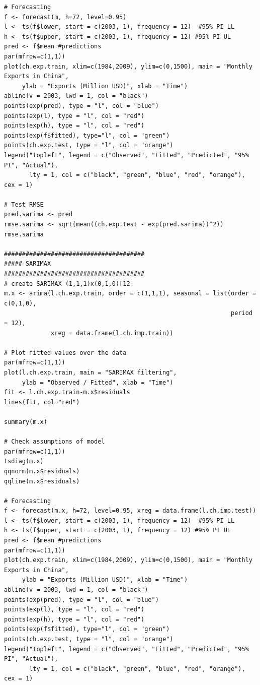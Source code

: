 \documentclass[]{article}
\begin{document}
\begin{Verbatim}[frame=single]
# Forecasting
f <- forecast(m, h=72, level=0.95)
l <- ts(f$lower, start = c(2003, 1), frequency = 12)  #95% PI LL
h <- ts(f$upper, start = c(2003, 1), frequency = 12) #95% PI UL
pred <- f$mean #predictions
par(mfrow=c(1,1))
plot(ch.exp.train, xlim=c(1984,2009), ylim=c(0,1500), main = "Monthly Exports in China",
     ylab = "Exports (Million USD)", xlab = "Time")
abline(v = 2003, lwd = 1, col = "black")
points(exp(pred), type = "l", col = "blue")
points(exp(l), type = "l", col = "red")
points(exp(h), type = "l", col = "red")
points(exp(f$fitted), type="l", col = "green")
points(ch.exp.test, type = "l", col = "orange")
legend("topleft", legend = c("Observed", "Fitted", "Predicted", "95% PI", "Actual"),
       lty = 1, col = c("black", "green", "blue", "red", "orange"), cex = 1)

# Test RMSE
pred.sarima <- pred
rmse.sarima <- sqrt(mean((ch.exp.test - exp(pred.sarima))^2))
rmse.sarima

#######################################
##### SARIMAX
#######################################
# create SARIMAX (1,1,1)x(0,1,0)[12]
m.x <- arima(l.ch.exp.train, order = c(1,1,1), seasonal = list(order = c(0,1,0),
                                                               period = 12),
             xreg = data.frame(l.ch.imp.train))

# Plot fitted values over the data
par(mfrow=c(1,1))
plot(l.ch.exp.train, main = "SARIMAX filtering", 
     ylab = "Observed / Fitted", xlab = "Time")
fit <- l.ch.exp.train-m.x$residuals
lines(fit, col="red")

summary(m.x)

# Check assumptions of model
par(mfrow=c(1,1))
tsdiag(m.x)
qqnorm(m.x$residuals)
qqline(m.x$residuals)

# Forecasting
f <- forecast(m.x, h=72, level=0.95, xreg = data.frame(l.ch.imp.test))
l <- ts(f$lower, start = c(2003, 1), frequency = 12)  #95% PI LL
h <- ts(f$upper, start = c(2003, 1), frequency = 12) #95% PI UL
pred <- f$mean #predictions
par(mfrow=c(1,1))
plot(ch.exp.train, xlim=c(1984,2009), ylim=c(0,1500), main = "Monthly Exports in China",
     ylab = "Exports (Million USD)", xlab = "Time")
abline(v = 2003, lwd = 1, col = "black")
points(exp(pred), type = "l", col = "blue")
points(exp(l), type = "l", col = "red")
points(exp(h), type = "l", col = "red")
points(exp(f$fitted), type="l", col = "green")
points(ch.exp.test, type = "l", col = "orange")
legend("topleft", legend = c("Observed", "Fitted", "Predicted", "95% PI", "Actual"),
       lty = 1, col = c("black", "green", "blue", "red", "orange"), cex = 1)


\end{Verbatim}
\end{document}
